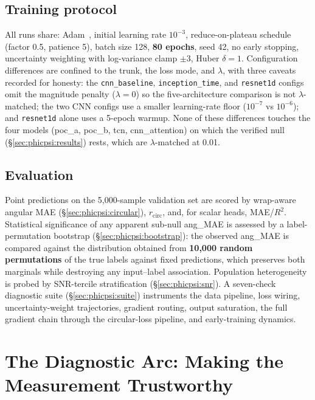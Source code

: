 \documentclass[11pt]{article}
\begin{document}
\subsection{Training protocol}
\label{sec:phicpsi:protocol}

All runs share: Adam~\citep{kingma2015adam}, initial learning rate $10^{-3}$, reduce-on-plateau schedule (factor 0.5, patience 5), batch size 128, \textbf{80 epochs}, seed 42, no early stopping, uncertainty weighting with log-variance clamp $\pm 3$, Huber $\delta = 1$.
Configuration differences are confined to the trunk, the loss mode, and $\lambda$, with three caveats recorded for honesty: the \texttt{cnn\_baseline}, \texttt{inception\_time}, and \texttt{resnet1d} configs omit the magnitude penalty ($\lambda = 0$) so the five-architecture comparison is not $\lambda$-matched; the two CNN configs use a smaller learning-rate floor ($10^{-7}$ vs $10^{-6}$); and \texttt{resnet1d} alone uses a 5-epoch warmup.
None of these differences touches the four models (poc\_a, poc\_b, tcn, cnn\_attention) on which the verified null (\S\ref{sec:phicpsi:results}) rests, which are $\lambda$-matched at 0.01.

\subsection{Evaluation}
\label{sec:phicpsi:evaluation}

Point predictions on the 5{,}000-sample validation set are scored by wrap-aware angular MAE (\S\ref{sec:phicpsi:circular}), $r_{\mathrm{circ}}$, and, for scalar heads, MAE/$R^2$.
Statistical significance of any apparent sub-null ang\_MAE is assessed by a label-permutation bootstrap (\S\ref{sec:phicpsi:bootstrap}): the observed ang\_MAE is compared against the distribution obtained from \textbf{10{,}000 random permutations} of the true labels against fixed predictions, which preserves both marginals while destroying any input--label association.
Population heterogeneity is probed by SNR-tercile stratification (\S\ref{sec:phicpsi:snr}).
A seven-check diagnostic suite (\S\ref{sec:phicpsi:suite}) instruments the data pipeline, loss wiring, uncertainty-weight trajectories, gradient routing, output saturation, the full gradient chain through the circular-loss pipeline, and early-training dynamics.


\section{The Diagnostic Arc: Making the Measurement Trustworthy}
\label{sec:phicpsi:arc}
\end{document}
